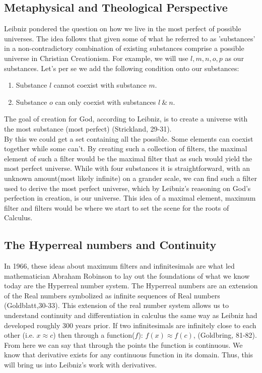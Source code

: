 \documentclass[12pt]{article}
\begin{document}
\subsection*{Metaphysical and Theological Perspective}
Leibniz pondered the question on how we live in the most perfect of possible universes.
The idea follows that given some of what he referred to as 'substances' in a non-contradictory combination of existing substances comprise a possible universe in Christian Creationism.
For example, we will use $l, m, n, o, p$ as our substances.
Let's per se we add the following condition onto our substances:
    \begin{enumerate}
        \item Substance $l$ cannot coexist with substance $m$.
        \item Substance $o$ can only coexist with substances $l \ \& \ n$.
    \end{enumerate}
The goal of creation for God, according to Leibniz, is to create a universe with the most substance (most perfect) (Strickland, 29-31). \\
By this we could get a set containing all the possible.
Some elements can coexist together while some can't.
By creating such a collection of filters, the maximal element of such a filter would be the maximal filter that as such would yield the most perfect universe.
While with four substances it is straightforward, with an unknown amount(most likely infinite) on a grander scale, we can find such a filter used to derive the most perfect universe, which by Leibniz's reasoning on God's perfection in creation, is our universe.
This idea of a maximal element, maximum filter and filters would be where we start to set the scene for the roots of Calculus.

    \subsection*{The Hyperreal numbers and Continuity}
In 1966, these ideas about maximum filters and infinitesimals are what led mathematician Abraham Robinson to lay out the foundations of what we know today are the Hyperreal number system.
The Hyperreal numbers are an extension of the Real numbers symbolized as infinite sequences of Real numbers (Goldblatt,30-33).
This extension of the real number system allows us to understand continuity and differentiation in calculus the same way as Leibniz had developed roughly 300 years prior.
If two infinitesimals are infinitely close to each other (i.e. $ x \approx c$) then through a function($f$):  $f(x) \approx  f(c)$, (Goldbring, 81-82).
From here we can say that through the points the function is continuous.
We know that derivative exists for any continuous function in its domain.
Thus, this will bring us into Leibniz's work with derivatives.
\end{document}
